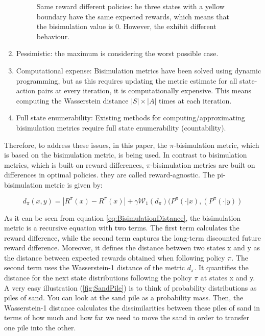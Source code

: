 \documentclass{usiinftr}
\begin{document}
\begin{enumerate}
\begin{figure}[h]
    \caption{Same reward different policies: he three states with a yellow boundary have the same expected rewards, which means that the bisimulation value is 0. However, the exhibit different behaviour.  \cite{github_contrastive_similarity}}
    \label{fig:ThreeJump}
\end{figure}
    \item Pessimistic: the maximum is considering the worst possible case. \cite{castro2020scalable}
    \item Computational expense: Bisimulation metrics have been solved using dynamic programming, but as this requires updating the metric estimate for all state-action pairs at every iteration, it is computationally expensive. This means computing the Wasserstein distance $|S|\times|A|$ times at each iteration. \cite{castro2020scalable}
    \item Full state enumerability: Existing methods for computing/approximating bisimulation metrics require full state enumerability (countability). \cite{castro2020scalable}
    
\end{enumerate}

Therefore, to address these issues, in this paper, the $\pi$-bisimulation metric, which is based on the bisimulation metric, is being used. In contrast to bisimulation metrics, which is built on reward differences, $\pi$-bisimulation metrics are built on differences in optimal policies. they are called reward-agnostic. The pi-bisimulation metric is given by: \cite{castro2020scalable}

\begin{equation}\label{eq:BisimulationDistance}
    d_{\pi}(x,y) = |R^{\pi}(x) - R^{\pi}(x)| + \gamma \mathcal{W}_1(d_{\pi}) (P^{\pi}(\cdot | x), (P^{\pi}(\cdot | y)) 
\end{equation}


As it can be seen from equation \ref{eq:BisimulationDistance}, the bisimulation metric is a recursive equation with two terms. The first term calculates the reward difference, while the second term captures the long-term discounted future reward difference. Moreover, it defines the distance between two states x and y as the distance between expected rewards obtained when following policy $\pi$. The second term uses the Wasserstein-1 distance of the metric $d_{\pi}$. It quantifies the distance for the next state distributions following the policy $\pi$ at states x and y. A very easy illustration (\ref{fig:SandPile}) is to think of probability distributions as piles of sand. You can look at the sand pile as a probability mass. Then, the Wasserstein-1 distance calculates the dissimilarities between these piles of sand in terms of how much and how far we need to move the sand in order to transfer one pile into the other.
\end{document}
